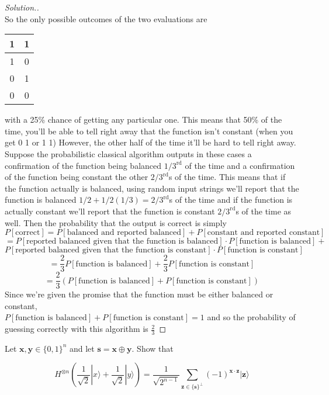 \documentclass[12pt]{article}
\newenvironment{problem}[2][Problem]{\begin{trivlist}
\item[\hskip \labelsep {\bfseries #1}\hskip \labelsep {\bfseries #2.}]}{\end{trivlist}}
\begin{document}
\begin{proof}[Solution.]~\\
So the only possible outcomes of the two evaluations are
\begin{table}[H]
\centering
\begin{tabular}{cc}
1 & 1\\
\hline
1 & 0\\
\hline
0 & 1\\
\hline
0 & 0
\end{tabular}
\end{table}
with a 25\% chance of getting any particular one. This means that 50\% of the time, you'll be
able to tell right away that the function isn't constant (when you get 0 1 or 1 1) However, the other half of the time it'll be hard to tell right away. Suppose the probabilistic classical algorithm outputs in these cases a confirmation of the function being balanced $1/3^\text{rd}$ of the time and a confirmation of the function being constant the other $2/3^\text{rd}$s of the time. This means that if the function actually is balanced, using random input strings we'll report that the function is balanced $1/2+1/2(1/3)=2/3^\text{rd}$s of the time and if the function is actually constant we'll report that the function is constant $2/3^\text{rd}$s of the time as well. Then the probability that the output is correct is simply
$$P[\text{correct}]=P[\text{balanced and reported balanced}]+P[\text{constant and reported constant}]$$
$$=P[\text{reported balanced given that the function is balanced}]\cdot P[\text{function is balanced}]+$$
$$P[\text{reported balanced given that the function is constant}]\cdot P[\text{function is constant}]$$
$$=\frac{2}{3}P[\text{function is balanced}]+\frac{2}{3}P[\text{function is constant}]$$
$$=\frac{2}{3}(P[\text{function is balanced}]+P[\text{function is constant}])$$
Since we're given the promise that the function must be either balanced or constant,\\ $P[\text{function is balanced}]+P[\text{function is constant}]=1$ and so the probability of guessing correctly with this algorithm is $\frac{2}{3}$
\end{proof}

\begin{problem}{6.5.1}
Let $\mathbf{x},\mathbf{y}\in\{0,1\}^n$ and let $\mathbf{s}=\mathbf{x}\oplus\mathbf{y}$. Show that

\begin{equation}
\label{eq:exponent cross product}
\tag{6.5.5}
H^{\otimes n}\left(\frac{1}{\sqrt{2}}|x\rangle+\frac{1}{\sqrt{2}}|y\rangle\right)
=
\frac{1}{\sqrt{2^{n-1}}}\sum_{\mathbf{z}\in\{\mathbf{s}\}^\perp}(-1)^{\mathbf{x}\cdot\mathbf{z}}|\mathbf{z}\rangle
\end{equation}

\end{problem}
\end{document}

